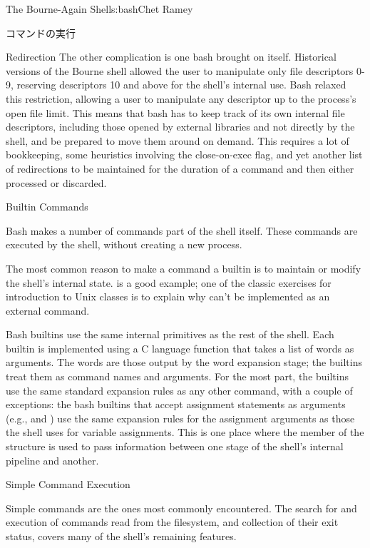 \begin{aosachapter}{The Bourne-Again Shell}{s:bash}{Chet Ramey}
\begin{aosasect1}{コマンドの実行}
\begin{aosasect2}{Redirection}
The other complication is one bash brought on itself.  Historical
versions of the Bourne shell allowed the user to manipulate only file
descriptors 0-9, reserving descriptors 10 and above for the shell's
internal use.  Bash relaxed this restriction, allowing a user to
manipulate any descriptor up to the process's open file limit.  This
means that bash has to keep track of its own internal file
descriptors, including those opened by external libraries and not
directly by the shell, and be prepared to move them around on demand.
This requires a lot of bookkeeping, some heuristics involving the
close-on-exec flag, and yet another list of redirections to be
maintained for the duration of a command and then either processed or
discarded.

\end{aosasect2}

\begin{aosasect2}{Builtin Commands}

Bash makes a number of commands part of the shell itself.  These
commands are executed by the shell, without creating a new process.

The most common reason to make a command a builtin is to maintain or
modify the shell's internal state.   is a good example; one
of the classic exercises for introduction to Unix classes is to
explain why  can't be implemented as an external command.

Bash builtins use the same internal primitives as the rest of the
shell.  Each builtin is implemented using a C language function that
takes a list of words as arguments.  The words are those output by the
word expansion stage; the builtins treat them as command names and
arguments.  For the most part, the builtins use the same standard
expansion rules as any other command, with a couple of exceptions: the
bash builtins that accept assignment statements as arguments (e.g.,
 and ) use the same expansion rules for the
assignment arguments as those the shell uses for variable assignments.
This is one place where the  member of the
 structure is used to pass information between one
stage of the shell's internal pipeline and another.

\end{aosasect2}

\begin{aosasect2}{Simple Command Execution}

Simple commands are the ones most commonly encountered.  The search
for and execution of commands read from the filesystem, and
collection of their exit status, covers many of the shell's remaining
features.


\end{aosasect2}
\end{aosasect1}
\end{aosachapter}
